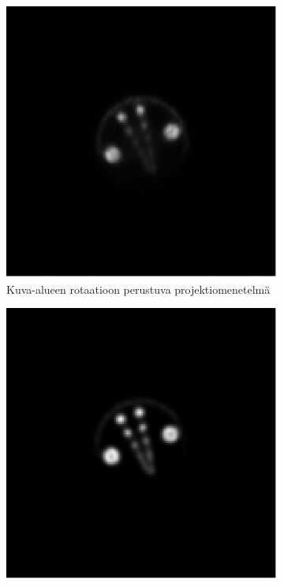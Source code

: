 \begin{figure}[H]
    \centering
    \captionsetup{width=.9\linewidth}
    \begin{subfigure}[t]{.25\textwidth}
        \includegraphics[width=\linewidth]{kuvat/pro_specta_rekonstruktio_proj6.pdf}
        \caption{Kuva-alueen rotaatioon perustuva projektiomenetelmä}
    \end{subfigure}%
    \hspace{.075\textwidth}%
    \begin{subfigure}[t]{.25\textwidth}
        \includegraphics[width=\linewidth]{kuvat/pro_specta_ground_truth.pdf}

\end{subfigure}
\end{figure}

